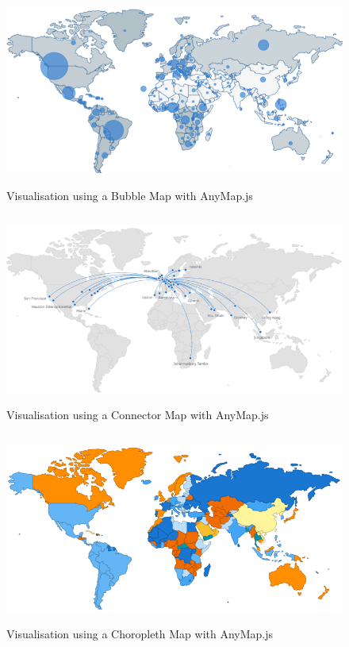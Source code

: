 \documentclass[doc,natbib]{apa6}
\begin{document}
\begin{figure}[H]
	\centering
	\includegraphics[height=6.3cm,keepaspectratio]{figures/fig4.png}
	\caption{\label{fig:4}Visualisation using a Bubble Map with AnyMap.js \citep{AnyChart2017a}}
\end{figure}

\begin{figure}[H]
	\centering
	\includegraphics[height=6.3cm,keepaspectratio]{figures/fig6.png}
	\caption{\label{fig:6}Visualisation using a Connector Map with AnyMap.js \citep{AnyChart2017}}
\end{figure}

\begin{figure}[H]
	\centering
	\includegraphics[height=6.3cm,keepaspectratio]{figures/fig5.png}
	\caption{\label{fig:5}Visualisation using a Choropleth Map with AnyMap.js  \citep{AnyChart2017b}}
\end{figure}
\end{document}
